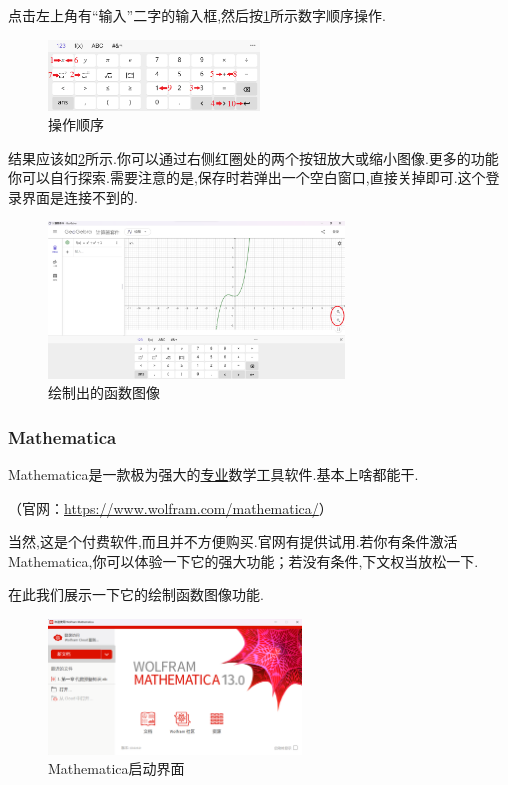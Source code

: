 \documentclass[lang=cn,math=cm,chinesefont=nofont,11pt,scheme=chinese,twocol]{elegantbook}
\begin{document}
点击左上角有“输入”二字的输入框,然后按\ref{img:geogebra3}所示数字顺序操作.

\begin{figure}[h]
  \centering
  \includegraphics[width=0.5\textwidth]{image/geogebra3.png}
  \caption{操作顺序}
  \label{img:geogebra3}
\end{figure}

结果应该如\ref{img:geogebra4}所示.你可以通过右侧红圈处的两个按钮放大或缩小图像.更多的功能你可以自行探索.需要注意的是,保存时若弹出一个空白窗口,直接关掉即可.这个登录界面是连接不到的.

\begin{figure}[h]
  \centering
  \includegraphics[width=0.7\textwidth]{image/geogebra4.png}
  \caption{绘制出的函数图像}
  \label{img:geogebra4}
\end{figure}

\subsubsection{Mathematica}

Mathematica是一款极为强大的\underline{专业}数学工具软件.基本上啥都能干.

（官网：\href{https://www.wolfram.com/mathematica/}{https://www.wolfram.com/mathematica/}）

当然,这是个付费软件,而且并不方便购买.官网有提供试用.若你有条件激活Mathematica,你可以体验一下它的强大功能；若没有条件,下文权当放松一下.

在此我们展示一下它的绘制函数图像功能.

\begin{figure}[h]
  \centering
  \includegraphics[width=0.6\textwidth]{image/mathematica1.png}
  \caption{Mathematica启动界面}
  \label{img:mathematica1}
\end{figure}
\end{document}
